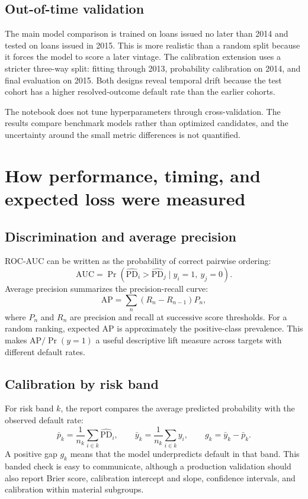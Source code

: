 \documentclass[11pt]{article}
\newcommand{\pd}{\widehat{\mathrm{PD}}}
\begin{document}
\subsection{Out-of-time validation}

The main model comparison is trained on loans issued no later than 2014 and tested
on loans issued in 2015. This is more realistic than a random split because it
forces the model to score a later vintage. The calibration extension uses a
stricter three-way split: fitting through 2013, probability calibration on 2014,
and final evaluation on 2015. Both designs reveal temporal drift because the test
cohort has a higher resolved-outcome default rate than the earlier cohorts.

The notebook does not tune hyperparameters through cross-validation. The results
compare benchmark models rather than optimized candidates, and the uncertainty
around the small metric differences is not quantified.

\section{How performance, timing, and expected loss were measured}

\subsection{Discrimination and average precision}

ROC-AUC can be written as the probability of correct pairwise ordering:
\[
  \mathrm{AUC}
  = \Pr(\pd_i > \pd_j \mid y_i=1,\ y_j=0).
\]
Average precision summarizes the precision-recall curve:
\[
  \mathrm{AP} = \sum_{n}(R_n-R_{n-1})P_n,
\]
where $P_n$ and $R_n$ are precision and recall at successive score thresholds.
For a random ranking, expected AP is approximately the positive-class prevalence.
This makes $\mathrm{AP}/\Pr(y=1)$ a useful descriptive lift measure across targets
with different default rates.

\subsection{Calibration by risk band}

For risk band $k$, the report compares the average predicted probability with the
observed default rate:
\[
  \bar p_k = \frac{1}{n_k}\sum_{i\in k}\pd_i,
  \qquad
  \bar y_k = \frac{1}{n_k}\sum_{i\in k}y_i,
  \qquad
  g_k = \bar y_k - \bar p_k.
\]
A positive gap $g_k$ means that the model underpredicts default in that band. This
banded check is easy to communicate, although a production validation should also
report Brier score, calibration intercept and slope, confidence intervals, and
calibration within material subgroups.
\end{document}
